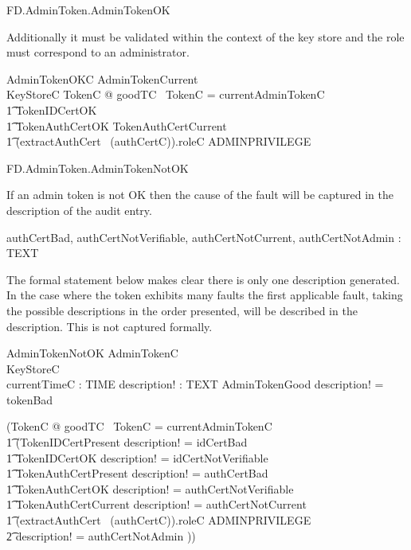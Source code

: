 \begin{traceunit}{FD.AdminToken.AdminTokenOK}
\end{traceunit}

Additionally it must be
validated within the context of the key store and the role
must correspond to an administrator.

\begin{schema}{AdminTokenOKC}
        AdminTokenCurrent
\\      KeyStoreC
\where
        \exists TokenC @ goodTC~ \theta TokenC = currentAdminTokenC
\\ \t1          \land TokenIDCertOK 
\\ \t1          \land TokenAuthCertOK \land TokenAuthCertCurrent
\\ \t1    \land (extractAuthCert~ (\The authCertC)).roleC \in ADMINPRIVILEGE
\end{schema}

\begin{traceunit}{FD.AdminToken.AdminTokenNotOK}
\end{traceunit}



If an admin token is not OK then the cause of the fault will be captured in
the description of the audit entry. 

\begin{axdef}
      authCertBad, authCertNotVerifiable, authCertNotCurrent,
      authCertNotAdmin : TEXT
\end{axdef}
  
The formal statement below makes clear there is only one description
generated. In the case where the token exhibits many faults the first
applicable fault, taking the possible descriptions in the order presented, 
will be described in the description. This is not captured formally. 


\begin{schema}{AdminTokenNotOK}
        AdminTokenC
\\      KeyStoreC
\\      currentTimeC : TIME
\also
        description! : TEXT
\where
        \lnot AdminTokenGood \land description! = tokenBad 

        \lor (\exists TokenC @ goodTC~ \theta TokenC = currentAdminTokenC
\\ \t1          \land 
        (\lnot TokenIDCertPresent  \land description! = idCertBad
\\ \t1  \lor \lnot TokenIDCertOK  \land description! = idCertNotVerifiable
\\ \t1  \lor \lnot TokenAuthCertPresent  \land description! = authCertBad
\\ \t1  \lor \lnot TokenAuthCertOK  \land description! = authCertNotVerifiable
\\ \t1  \lor \lnot TokenAuthCertCurrent \land description! = authCertNotCurrent
\\ \t1  \lor (extractAuthCert~ (\The authCertC)).roleC \notin ADMINPRIVILEGE
\\ \t2       \land description! = authCertNotAdmin
))
\end{schema}

